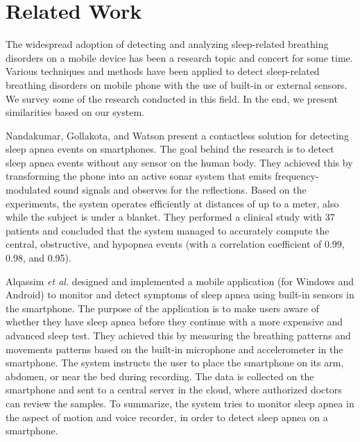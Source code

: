 \chapter{Related Work}
The widespread adoption of detecting and analyzing sleep-related breathing disorders on a mobile device has been a research topic and concert for some time. Various techniques and methods have been applied to detect sleep-related breathing disorders on mobile phone with the use of built-in or external sensors. We survey some of the research conducted in this field. In the end, we present similarities based on our system. 

Nandakumar, Gollakota, and Watson \cite{contactless_sleep} present a contactless solution for detecting sleep apnea events on smartphones. The goal behind the research is to detect sleep apnea events without any sensor on the human body. They achieved this by transforming the phone into an active sonar system that emits frequency-modulated sound signals and observes for the reflections. Based on the experiments, the system operates efficiently at distances of up to a meter, also while the subject is under a blanket. They performed a clinical study with 37 patients and concluded that the system managed to accurately compute the central, obstructive, and hypopnea events (with a correlation coefficient of 0.99, 0.98, and 0.95). 

Alqassim \textit{et al.} \cite{sam} designed and implemented a mobile application (for Windows and Android) to monitor and detect symptoms of sleep apnea using built-in sensors in the smartphone. The purpose of the application is to make users aware of whether they have sleep apnea before they continue with a more expensive and advanced sleep test. They achieved this by measuring the breathing patterns and movements patterns based on the built-in microphone and accelerometer in the smartphone. The system instructs the user to place the smartphone on its arm, abdomen, or near the bed during recording. The data is collected on the smartphone and sent to a central server in the cloud, where authorized doctors can review the samples. To summarize, the system tries to monitor sleep apnea in the aspect of motion and voice recorder, in order to detect sleep apnea on a smartphone. 

